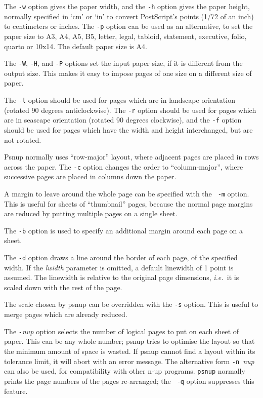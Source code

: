 \documentclass[twoside,11pt]{article}
\begin{document}
\begin{itemize}
The {\tt -w} option gives the paper width, and the {\tt -h} option
gives the paper height, normally specified in `cm' or `in' to convert
PostScript's points (1/72 of an inch) to centimeters or inches. The
{\tt -p} option can be used as an alternative, to set the paper size
to A3, A4, A5, B5, letter, legal, tabloid, statement, executive,
folio, quarto or 10x14. The default paper size is A4. 

The {\tt -W}, {\tt -H}, and {\tt -P} options set the input paper size,
if it is different from the output size. This makes it easy to impose
pages of one size on a different size of paper. 

The {\tt -l} option should be used for pages which are in landscape
orientation (rotated 90 degrees anticlockwise). The {\tt -r} option
should be used for pages which are in seascape orientation (rotated 90
degrees clockwise), and the {\tt -f} option should be used for pages
which have the width and height interchanged, but are not rotated. 

Psnup normally uses ``row-major'' layout, where adjacent pages are
placed in rows across the paper. The {\tt -c} option changes the order
to ``column-major'', where successive pages are placed in columns down
the paper. 

A margin to leave around the whole page can be specified with the {\tt
-m} option. This is useful for sheets of ``thumbnail'' pages, because
the normal page margins are reduced by putting multiple pages on a
single sheet. 

The {\tt -b} option is used to specify an additional margin around
each page on a sheet. 

The {\tt -d} option draws a line around the border of each page, of
the specified width. If the {\em lwidth} parameter is omitted, a
default linewidth of 1 point is assumed. The linewidth is relative to
the original page dimensions, {\em i.e.\ }it is scaled down with the
rest of the page. 

The scale chosen by psnup can be overridden with the {\tt -s} option.
This is useful to merge pages which are already reduced. 

The {\tt -}{\em nup} option selects the number of logical pages to put
on each sheet of paper. This can be any whole number; psnup tries to
optimise the layout so that the minimum amount of space is wasted. If
psnup cannot find a layout within its tolerance limit, it will abort
with an error message. The alternative form {\tt -n }{\em nup} can
also be used, for compatibility with other n-up programs. {\tt psnup}
normally prints the page numbers of the pages re-arranged; the {\tt
-q} option suppresses this feature. 


\end{itemize}
\end{document}
